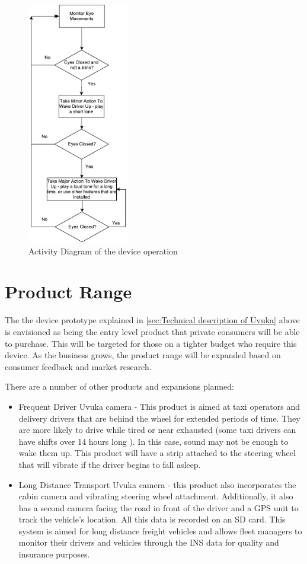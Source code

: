 \begin{figure}[H]
\centering
\includegraphics[width=0.4\textwidth]{images/ProductFlowchart}
\vskip10pt
\caption[Device Operation Activity Diagram]{Activity Diagram of the device operation}
\label{fig:DeviceFlowChart}
\end{figure}

\section{Product Range}
The the device prototype explained in \cref{sec:Technical description of Uvuka} above is envisioned as being the entry level product that private consumers will be able to purchase. This will be targeted for those on a tighter budget who require this device. As the business grows, the product range will be expanded based on consumer feedback and market research.

There are a number of other products and expansions planned:
\begin{itemize}
\item Frequent Driver Uvuka camera - This product is aimed at taxi operators and delivery drivers that are behind the wheel for extended periods of time. They are more likely to drive while tired or near exhausted (some taxi drivers can have shifts over 14 hours long \cite{taxiDriverHours}). In this case, sound may not be enough to wake them up. This product will have a strip attached to the steering wheel that will vibrate if the driver begins to fall asleep.
\item Long Distance Transport Uvuka camera - this product also incorporates the cabin camera and vibrating steering wheel attachment. Additionally, it also has a second camera facing the road in front of the driver and a GPS unit to track the vehicle's location. All this data is recorded on an SD card. This system is aimed for long distance freight vehicles and allows fleet managers to monitor their drivers and vehicles through the INS data for quality and insurance purposes.
\end{itemize}

